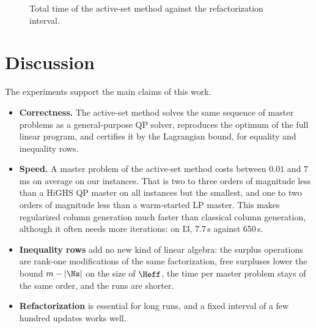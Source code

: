 \begin{figure}[ht]
\centering
{}
\caption{Total time of the active-set method against the refactorization interval.}
\label{fig:refactor}
\end{figure}


\section{Discussion}
\label{sec:discussion}

The experiments support the main claims of this work.
\begin{itemize}
    \item \textbf{Correctness.} The active-set method solves the same sequence of master
          problems as a general-purpose QP solver, reproduces the optimum of the full linear
          program, and certifies it by the Lagrangian bound, for equality and inequality rows.
    \item \textbf{Speed.} A master problem of the active-set method costs between $0.01$ and
          $7$\,ms on average on our instances. That is two to three orders of magnitude less than a
          HiGHS QP master on all instances but the smallest, and one to two orders of magnitude less
          than a warm-started LP master. This
          makes regularized column generation much faster than classical column generation,
          although it often needs more iterations: on I3, 7.7\,s against 650\,s.
    \item \textbf{Inequality rows} add no new kind of linear algebra: the surplus operations
          are rank-one modifications of the same factorization, free surpluses lower the bound
          $m - |\Ns|$ on the size of $\Heff$, the time per master problem stays of the same
          order, and the runs are shorter.
    \item \textbf{Refactorization} is essential for long runs, and a fixed interval of a
          few hundred updates works well.
\end{itemize}

